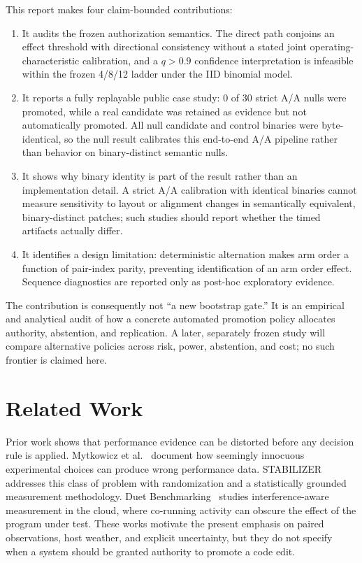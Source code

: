 \documentclass[10pt]{article}
\newcommand{\NullCount}{30}
\newcommand{\NullPromotions}{0}
\begin{document}
This report makes four claim-bounded contributions:
\begin{enumerate}
  \item It audits the frozen authorization semantics.  The direct path conjoins
  an effect threshold with directional consistency without a stated joint
  operating-characteristic calibration, and a $q>0.9$ confidence
  interpretation is infeasible within the frozen 4/8/12 ladder under the IID
  binomial model.
  \item It reports a fully replayable public case study: \NullPromotions{} of
  \NullCount{} strict A/A nulls were promoted, while a real candidate was
  retained as evidence but not automatically promoted.  All null candidate
  and control binaries were byte-identical, so the null result calibrates this
  end-to-end A/A pipeline rather than behavior on binary-distinct semantic
  nulls.
  \item It shows why binary identity is part of the result rather than an
  implementation detail.  A strict A/A calibration with identical binaries
  cannot measure sensitivity to layout or alignment changes in semantically
  equivalent, binary-distinct patches; such studies should report whether the
  timed artifacts actually differ.
  \item It identifies a design limitation: deterministic alternation makes arm
  order a function of pair-index parity, preventing identification of an arm
  order effect.  Sequence diagnostics are reported only as post-hoc
  exploratory evidence.
\end{enumerate}

The contribution is consequently not ``a new bootstrap gate.''  It is an
empirical and analytical audit of how a concrete automated promotion policy
allocates authority, abstention, and replication.  A later, separately frozen
study will compare alternative policies across risk, power, abstention, and
cost; no such frontier is claimed here.

\section{Related Work}

Prior work shows that performance evidence can be distorted before any
decision rule is applied.  Mytkowicz et al.~\citep{mytkowicz2009} document how
seemingly innocuous experimental choices can produce wrong performance data.
STABILIZER~\citep{curtsinger2013} addresses this class of problem with
randomization and a statistically grounded measurement methodology.  Duet
Benchmarking~\citep{bulej2020duet} studies interference-aware measurement in
the cloud, where co-running activity can obscure the effect of the program
under test.  These works motivate the present emphasis on paired observations,
host weather, and explicit uncertainty, but they do not specify when a system
should be granted authority to promote a code edit.
\end{document}
